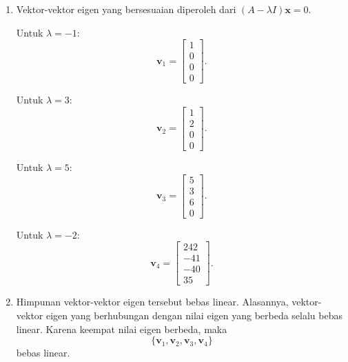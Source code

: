 \documentclass[10pt,a4paper]{article}
\begin{document}
\begin{enumerate}
        \begin{enumerate}
          \item Vektor-vektor eigen yang bersesuaian diperoleh dari $(A-\lambda I)\mathbf{x}=0$.

                Untuk $\lambda=-1$:
                \[
                  \mathbf{v}_1=
                  \begin{bmatrix}
                    1\\0\\0\\0
                  \end{bmatrix}.
                \]

                Untuk $\lambda=3$:
                \[
                  \mathbf{v}_2=
                  \begin{bmatrix}
                    1\\2\\0\\0
                  \end{bmatrix}.
                \]

                Untuk $\lambda=5$:
                \[
                  \mathbf{v}_3=
                  \begin{bmatrix}
                    5\\3\\6\\0
                  \end{bmatrix}.
                \]

                Untuk $\lambda=-2$:
                \[
                  \mathbf{v}_4=
                  \begin{bmatrix}
                    242\\-41\\-40\\35
                  \end{bmatrix}.
                \]

          \item Himpunan vektor-vektor eigen tersebut bebas linear. Alasannya, vektor-vektor eigen yang berhubungan dengan nilai eigen yang berbeda selalu bebas linear. Karena keempat nilai eigen berbeda, maka
                \[
                  \{\mathbf{v}_1,\mathbf{v}_2,\mathbf{v}_3,\mathbf{v}_4\}
                \]
                bebas linear.


\end{enumerate}
\end{enumerate}
\end{document}
